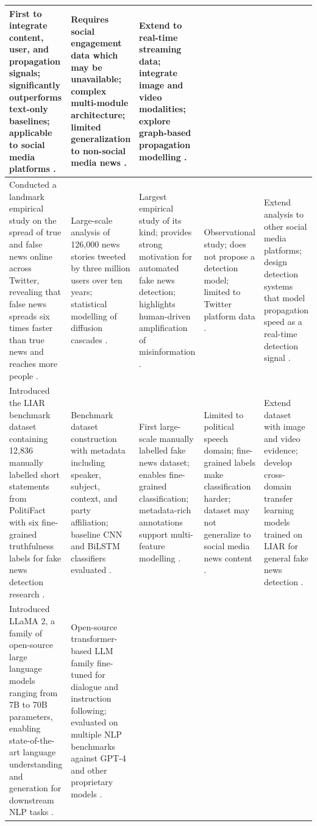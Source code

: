 \documentclass[runningheads]{llncs}
\begin{document}
\begin{longtable}{|p{}|p{}|p{}|p{}|p{}|}
First to integrate content, user, and propagation signals; significantly outperforms text-only baselines; applicable to social media platforms \cite{Ruchansky2017CSI}. &
Requires social engagement data which may be unavailable; complex multi-module architecture; limited generalization to non-social media news \cite{Ruchansky2017CSI}. &
Extend to real-time streaming data; integrate image and video modalities; explore graph-based propagation modelling \cite{Ruchansky2017CSI}. \\ \hline
Conducted a landmark empirical study on the spread of true and false news online across Twitter, revealing that false news spreads six times faster than true news and reaches more people \cite{Vosoughi2018Spread}. &
Large-scale analysis of 126,000 news stories tweeted by three million users over ten years; statistical modelling of diffusion cascades \cite{Vosoughi2018Spread}. &
Largest empirical study of its kind; provides strong motivation for automated fake news detection; highlights human-driven amplification of misinformation \cite{Vosoughi2018Spread}. &
Observational study; does not propose a detection model; limited to Twitter platform data \cite{Vosoughi2018Spread}. &
Extend analysis to other social media platforms; design detection systems that model propagation speed as a real-time detection signal \cite{Vosoughi2018Spread}. \\ \hline
Introduced the LIAR benchmark dataset containing 12,836 manually labelled short statements from PolitiFact with six fine-grained truthfulness labels for fake news detection research \cite{Wang2017Liar}. &
Benchmark dataset construction with metadata including speaker, subject, context, and party affiliation; baseline CNN and BiLSTM classifiers evaluated \cite{Wang2017Liar}. &
First large-scale manually labelled fake news dataset; enables fine-grained classification; metadata-rich annotations support multi-feature modelling \cite{Wang2017Liar}. &
Limited to political speech domain; fine-grained labels make classification harder; dataset may not generalize to social media news content \cite{Wang2017Liar}. &
Extend dataset with image and video evidence; develop cross-domain transfer learning models trained on LIAR for general fake news detection \cite{Wang2017Liar}. \\ \hline
Introduced LLaMA 2, a family of open-source large language models ranging from 7B to 70B parameters, enabling state-of-the-art language understanding and generation for downstream NLP tasks \cite{Touvron2023Llama2}. &
Open-source transformer-based LLM family fine-tuned for dialogue and instruction following; evaluated on multiple NLP benchmarks against GPT-4 and other proprietary models \cite{Touvron2023Llama2}. &

\end{longtable}
\end{document}
